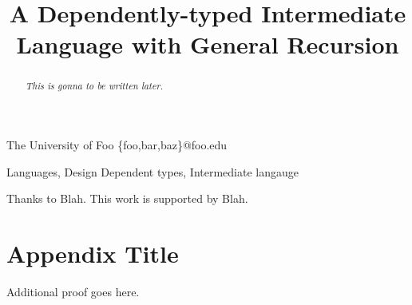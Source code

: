 \documentclass[preprint]{sigplanconf}
\begin{document}
\setlength{\pdfpageheight}{\paperheight}
\setlength{\pdfpagewidth}{\paperwidth}


\preprintfooter{} %

\title{A Dependently-typed Intermediate Language with General Recursion}
\subtitle{}

           {The University of Foo}
           {\{foo,bar,baz\}@foo.edu}

\maketitle

\begin{abstract}
\emph{This is gonna to be written later.}
\end{abstract}

\terms Languages, Design
\keywords Dependent types, Intermediate langauge

















\acks
Thanks to Blah. This work is supported by Blah.


\nocite{*}



\appendix
\section{Appendix Title}
Additional proof goes here.

\end{document}
